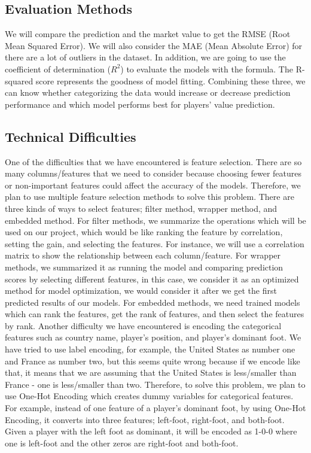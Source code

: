 \documentclass[conference]{IEEEtran}
\begin{document}
\subsection{Evaluation Methods}
We will compare the prediction and the market value to get the RMSE (Root Mean Squared Error). We will also consider the MAE (Mean Absolute Error) for there are a lot of outliers in the dataset. In addition, we are going to use the coefficient of determination (\(R^2\)) to evaluate the models with the formula. The R-squared score represents the goodness of model fitting. Combining these three, we can know whether categorizing the data would increase or decrease prediction performance and which model performs best for players' value prediction.


\subsection{Technical Difficulties}
One of the difficulties that we have encountered is feature selection. There are so many columns/features that we need to consider because choosing fewer features or non-important features could affect the accuracy of the models. Therefore, we plan to use multiple feature selection methods to solve this problem. There are three kinds of ways to select features; filter method, wrapper method, and embedded method. For filter methods, we summarize the operations which will be used on our project, which would be like ranking the feature by correlation, setting the gain, and selecting the features. For instance, we will use a correlation matrix to show the relationship between each column/feature. For wrapper methods, we summarized it as running the model and comparing prediction scores by selecting different features, in this case, we consider it as an optimized method for model optimization, we would consider it after we get the first predicted results of our models. For embedded methods, we need trained models which can rank the features, get the rank of features, and then select the features by rank.
Another difficulty we have encountered is encoding the categorical features such as country name, player’s position, and player’s dominant foot. We have tried to use label encoding, for example, the United States as number one and France as number two, but this seems quite wrong because if we encode like that, it means that we are assuming that the United States is less/smaller than France - one is less/smaller than two. Therefore, to solve this problem, we plan to use One-Hot Encoding which creates dummy variables for categorical features. For example, instead of one feature of a player's dominant foot, by using One-Hot Encoding, it converts into three features; left-foot, right-foot, and both-foot. Given a player with the left foot as dominant, it will be encoded as 1-0-0 where one is left-foot and the other zeros are right-foot and both-foot.
\end{document}
